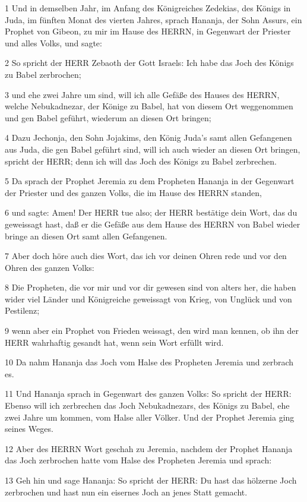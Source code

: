\par 1 Und in demselben Jahr, im Anfang des Königreiches Zedekias, des Königs in Juda, im fünften Monat des vierten Jahres, sprach Hananja, der Sohn Assurs, ein Prophet von Gibeon, zu mir im Hause des HERRN, in Gegenwart der Priester und alles Volks, und sagte:
\par 2 So spricht der HERR Zebaoth der Gott Israels: Ich habe das Joch des Königs zu Babel zerbrochen;
\par 3 und ehe zwei Jahre um sind, will ich alle Gefäße des Hauses des HERRN, welche Nebukadnezar, der Könige zu Babel, hat von diesem Ort weggenommen und gen Babel geführt, wiederum an diesen Ort bringen;
\par 4 Dazu Jechonja, den Sohn Jojakims, den König Juda's samt allen Gefangenen aus Juda, die gen Babel geführt sind, will ich auch wieder an diesen Ort bringen, spricht der HERR; denn ich will das Joch des Königs zu Babel zerbrechen.
\par 5 Da sprach der Prophet Jeremia zu dem Propheten Hananja in der Gegenwart der Priester und des ganzen Volks, die im Hause des HERRN standen,
\par 6 und sagte: Amen! Der HERR tue also; der HERR bestätige dein Wort, das du geweissagt hast, daß er die Gefäße aus dem Hause des HERRN von Babel wieder bringe an diesen Ort samt allen Gefangenen.
\par 7 Aber doch höre auch dies Wort, das ich vor deinen Ohren rede und vor den Ohren des ganzen Volks:
\par 8 Die Propheten, die vor mir und vor dir gewesen sind von alters her, die haben wider viel Länder und Königreiche geweissagt von Krieg, von Unglück und von Pestilenz;
\par 9 wenn aber ein Prophet von Frieden weissagt, den wird man kennen, ob ihn der HERR wahrhaftig gesandt hat, wenn sein Wort erfüllt wird.
\par 10 Da nahm Hananja das Joch vom Halse des Propheten Jeremia und zerbrach es.
\par 11 Und Hananja sprach in Gegenwart des ganzen Volks: So spricht der HERR: Ebenso will ich zerbrechen das Joch Nebukadnezars, des Königs zu Babel, ehe zwei Jahre um kommen, vom Halse aller Völker. Und der Prophet Jeremia ging seines Weges.
\par 12 Aber des HERRN Wort geschah zu Jeremia, nachdem der Prophet Hananja das Joch zerbrochen hatte vom Halse des Propheten Jeremia und sprach:
\par 13 Geh hin und sage Hananja: So spricht der HERR: Du hast das hölzerne Joch zerbrochen und hast nun ein eisernes Joch an jenes Statt gemacht.
